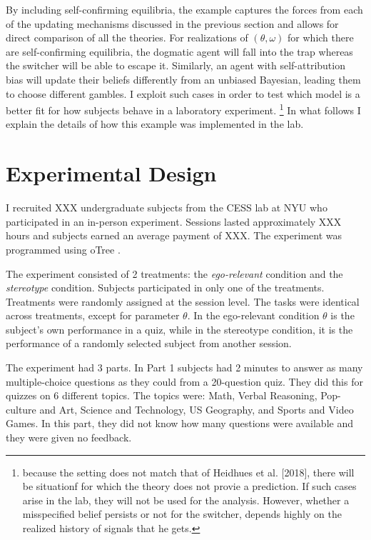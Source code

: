 \documentclass[
  12pt,
]{article}
\begin{document}
By including self-confirming equilibria, the example captures the forces
from each of the updating mechanisms discussed in the previous section
and allows for direct comparison of all the theories. For realizations
of \((\theta, \omega)\) for which there are self-confirming equilibria,
the dogmatic agent will fall into the trap whereas the switcher will be
able to escape it. Similarly, an agent with self-attribution bias will
update their beliefs differently from an unbiased Bayesian, leading them
to choose different gambles. I exploit such cases in order to test which
model is a better fit for how subjects behave in a laboratory
experiment.
\footnote{because the setting does not match that of Heidhues et al. [2018], there will be situationf for which the theory 
does not provie a prediction. If such cases arise in the lab, they will not be used for the analysis. However, whether a misspecified 
belief persists or not for the switcher, depends highly on the realized history of signals that he gets.}
In what follows I explain the details of how this example was
implemented in the lab.

\hypertarget{experimental-design}{%
\section{Experimental Design}\label{experimental-design}}

I recruited XXX undergraduate subjects from the CESS lab at NYU who
participated in an in-person experiment. Sessions lasted approximately
XXX hours and subjects earned an average payment of XXX. The experiment
was programmed using oTree \citep{chen2016otree}.

The experiment consisted of 2 treatments: the \emph{ego-relevant}
condition and the \emph{stereotype} condition. Subjects participated in
only one of the treatments. Treatments were randomly assigned at the
session level. The tasks were identical across treatments, except for
parameter \(\theta\). In the ego-relevant condition \(\theta\) is the
subject's own performance in a quiz, while in the stereotype condition,
it is the performance of a randomly selected subject from another
session.

The experiment had 3 parts. In Part 1 subjects had 2 minutes to answer
as many multiple-choice questions as they could from a 20-question quiz.
They did this for quizzes on 6 different topics. The topics were: Math,
Verbal Reasoning, Pop-culture and Art, Science and Technology, US
Geography, and Sports and Video Games. In this part, they did not know
how many questions were available and they were given no feedback.
\end{document}
